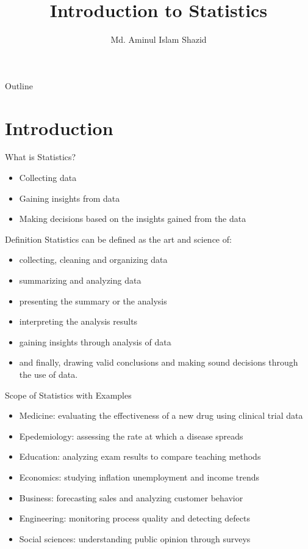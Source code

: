 \documentclass[12pt, aspectratio=169]{beamer}
\title{Introduction to Statistics}
\author{Md. Aminul Islam Shazid}
\date{}
\begin{document}
    {
		\addtocounter{framenumber}{-2}    %

		\begin{frame}
			\titlepage
		\end{frame}

		\begin{frame}{Outline}
            \vfill
			\tableofcontents[subsectionstyle=hide]
            \vfill
		\end{frame}
	}

	\section{Introduction}

	\begin{frame}{What is Statistics?}
		\begin{itemize}
			\item Collecting data
			\item Gaining insights from data
			\item Making decisions based on the insights gained from the data
		\end{itemize}
	\end{frame}


	\begin{frame}{Definition}
		Statistics can be defined as the art and science of:
		\begin{itemize}
			\item collecting, cleaning and organizing data
			\item summarizing and analyzing data
			\item presenting the summary or the analysis
			\item interpreting the analysis results
			\item gaining insights through analysis of data
			\item and finally, drawing valid conclusions and making sound decisions through the use of data.
		\end{itemize}
	\end{frame}


	\begin{frame}{Scope of Statistics with Examples}
		\begin{itemize}
			\item Medicine: evaluating the effectiveness of a new drug using clinical trial data
			\item Epedemiology: assessing the rate at which a disease spreads
			\item Education: analyzing exam results to compare teaching methods
			\item Economics: studying inflation unemployment and income trends
			\item Business: forecasting sales and analyzing customer behavior
			\item Engineering: monitoring process quality and detecting defects
			\item Social sciences: understanding public opinion through surveys
		\end{itemize}
	\end{frame}
\end{document}

